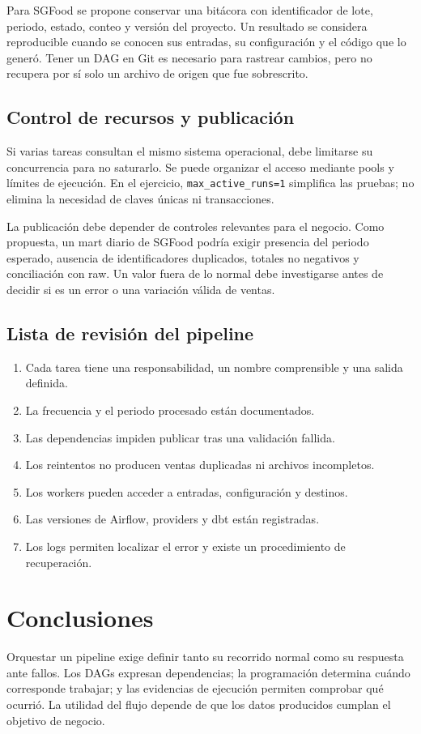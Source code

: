 \documentclass[12pt]{article}
\begin{document}
Para SGFood se propone conservar una bitácora con identificador de lote, periodo, estado, conteo y versión del proyecto. Un resultado se considera reproducible cuando se conocen sus entradas, su configuración y el código que lo generó. Tener un DAG en Git es necesario para rastrear cambios, pero no recupera por sí solo un archivo de origen que fue sobrescrito.

\subsection{Control de recursos y publicación}
Si varias tareas consultan el mismo sistema operacional, debe limitarse su concurrencia para no saturarlo. Se puede organizar el acceso mediante pools y límites de ejecución. En el ejercicio, \texttt{max\_active\_runs=1} simplifica las pruebas; no elimina la necesidad de claves únicas ni transacciones.

La publicación debe depender de controles relevantes para el negocio. Como propuesta, un mart diario de SGFood podría exigir presencia del periodo esperado, ausencia de identificadores duplicados, totales no negativos y conciliación con raw. Un valor fuera de lo normal debe investigarse antes de decidir si es un error o una variación válida de ventas.

\subsection{Lista de revisión del pipeline}
\begin{enumerate}[leftmargin=*]
\item Cada tarea tiene una responsabilidad, un nombre comprensible y una salida definida.
\item La frecuencia y el periodo procesado están documentados.
\item Las dependencias impiden publicar tras una validación fallida.
\item Los reintentos no producen ventas duplicadas ni archivos incompletos.
\item Los workers pueden acceder a entradas, configuración y destinos.
\item Las versiones de Airflow, providers y dbt están registradas.
\item Los logs permiten localizar el error y existe un procedimiento de recuperación.
\end{enumerate}

\section{Conclusiones}
Orquestar un pipeline exige definir tanto su recorrido normal como su respuesta ante fallos. Los DAGs expresan dependencias; la programación determina cuándo corresponde trabajar; y las evidencias de ejecución permiten comprobar qué ocurrió. La utilidad del flujo depende de que los datos producidos cumplan el objetivo de negocio.
\end{document}
